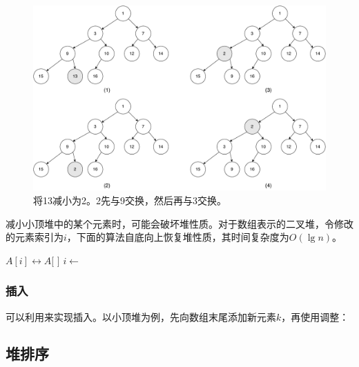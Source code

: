 \documentclass[b5paper]{ctexart}
\begin{document}
\begin{figure}[htbp]
  \centering
  \includegraphics[scale=0.4]{img/decrease-key}
  \caption{将13减小为2。2先与9交换，然后再与3交换。}
  \label{fig:decrease-key-2}
\end{figure}

减小小顶堆中的某个元素时，可能会破坏堆性质。对于数组表示的二叉堆，令修改的元素索引为$i$，下面的算法自底向上恢复堆性质，其时间复杂度为$O(\lg n)$。

\begin{algorithmic}[1]
    \State {} $A[i] \leftrightarrow A[$  $]$
    \State $i \gets$  
  \EndWhile
\EndFunction
\end{algorithmic}

\subsubsection{插入}

可以利用来实现插入\cite{CLRS}。以小顶堆为例，先向数组末尾添加新元素$k$，再使用调整：

\begin{algorithmic}[1]
  \State {}
  \State {}
\EndFunction
\end{algorithmic}

\subsection{堆排序}
\label{heap-sort} 
\end{document}

